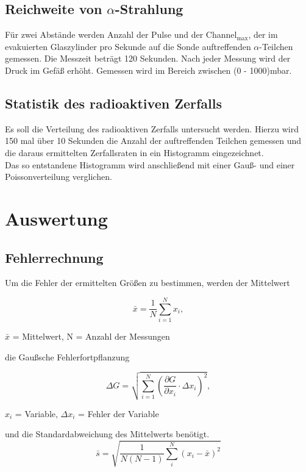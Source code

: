 \subsection{Reichweite von $\alpha$-Strahlung}
Für zwei Abstände werden Anzahl der Pulse und der Channel$_{\text{max}}$, der im evakuierten Glaszylinder pro Sekunde auf die Sonde auftreffenden $\alpha$-Teilchen gemessen. Die Messzeit beträgt 120 Sekunden. Nach jeder Messung wird der Druck im Gefäß erhöht. Gemessen wird im Bereich zwischen (0 - 1000)mbar.\\

\subsection{Statistik des radioaktiven Zerfalls}
Es soll die Verteilung des radioaktiven Zerfalls untersucht werden. Hierzu wird 150 mal über 10 Sekunden die Anzahl der auftreffenden Teilchen gemessen und die daraus ermittelten Zerfallsraten in ein Histogramm eingezeichnet.\\
Das so entstandene Histogramm wird anschließend mit einer Gauß- und einer Poissonverteilung verglichen.
\section{Auswertung}
\subsection{Fehlerrechnung}
Um die Fehler der ermittelten Größen zu bestimmen, werden der Mittelwert
\begin{formel}[H]
\begin{equation}
 \bar{x} = \frac1N \sum_{i=1}^{N} x_i,
 \label{eq_mittel}
\end{equation}
\caption*{\small{$\bar{x}$ = Mittelwert, N = Anzahl der Messungen}}
\end{formel}
die Gaußsche Fehlerfortpflanzung
\begin{formel}[H]
\begin{equation}
\Delta G = \sqrt{\sum_{i=1}^{N}\left( \frac{\partial G}{\partial x_i}\cdot \Delta x_i\right)^2},
\label{gauss}
\end{equation}
\caption*{$x_i$ = Variable, $\Delta x_i$ = Fehler der Variable}
\end{formel}
und die Standardabweichung des Mittelwerts benötigt.
\begin{equation}
 \bar s = \sqrt{\frac{1}{N(N-1)} \sum_{i}^{N} (x_i - \bar{x})^2}
 \label{eq_standard}
\end{equation}
\newpage
